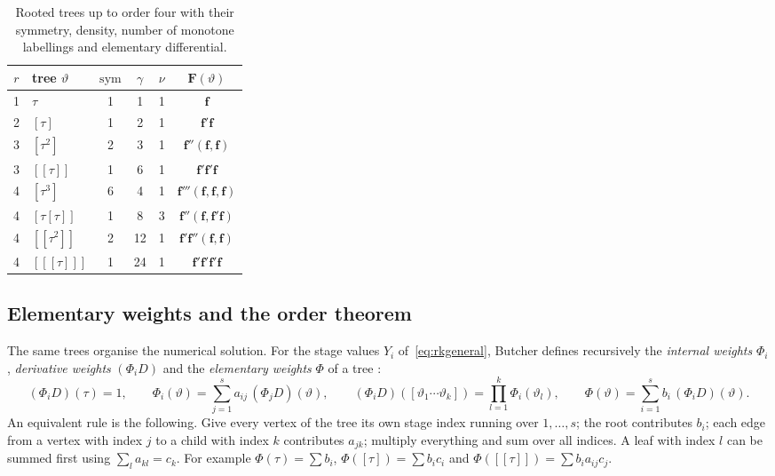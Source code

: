 \documentclass[11pt,a4paper]{article}
\newcommand{\bff}{\mathbf{f}}
\begin{document}
\begin{table}[H]
\centering
\begin{tabular}{@{}clcccc@{}}
\toprule
$r$ & tree $\vartheta$ & $\mathrm{sym}$ & $\gamma$ & $\nu$ & $\mathbf F(\vartheta)$\\
\midrule
1 & $\tau$ & 1 & 1 & 1 & $\bff$\\
2 & $[\tau]$ & 1 & 2 & 1 & $\bff'\bff$\\
3 & $[\tau^2]$ & 2 & 3 & 1 & $\bff''(\bff,\bff)$\\
3 & $[[\tau]]$ & 1 & 6 & 1 & $\bff'\bff'\bff$\\
4 & $[\tau^3]$ & 6 & 4 & 1 & $\bff'''(\bff,\bff,\bff)$\\
4 & $[\tau[\tau]]$ & 1 & 8 & 3 & $\bff''(\bff,\bff'\bff)$\\
4 & $[[\tau^2]]$ & 2 & 12 & 1 & $\bff'\bff''(\bff,\bff)$\\
4 & $[[[\tau]]]$ & 1 & 24 & 1 & $\bff'\bff'\bff'\bff$\\
\bottomrule
\end{tabular}
\caption{Rooted trees up to order four with their symmetry, density, number of monotone labellings and
elementary differential.}
\label{tab:trees}
\end{table}

\subsection{Elementary weights and the order theorem}\label{sec:orderthm}

The same trees organise the numerical solution. For the stage values $Y_i$ of~\eqref{eq:rkgeneral}, Butcher
defines recursively the \emph{internal weights} $\Phi_i$, \emph{derivative weights} $(\Phi_iD)$ and the
\emph{elementary weights} $\Phi$ of a tree \cite[Def.~312A]{butcher2008}:
\begin{equation}
(\Phi_iD)(\tau)=1,\qquad
\Phi_i(\vartheta)=\sum_{j=1}^{s}a_{ij}\,(\Phi_jD)(\vartheta),\qquad
(\Phi_iD)([\vartheta_1\cdots\vartheta_k])=\prod_{l=1}^{k}\Phi_i(\vartheta_l),\qquad
\Phi(\vartheta)=\sum_{i=1}^{s}b_i\,(\Phi_iD)(\vartheta).
\end{equation}
An equivalent rule \cite[Lemma~312B]{butcher2008} is the following. Give every vertex of the tree its own
stage index running over $1,\dots,s$; the root contributes $b_i$; each edge from a vertex with index $j$ to
a child with index $k$ contributes $a_{jk}$; multiply everything and sum over all indices. A leaf with index
$l$ can be summed first using $\sum_la_{kl}=c_k$. For example $\Phi(\tau)=\sum b_i$, $\Phi([\tau])=\sum b_ic_i$ and
$\Phi([[\tau]])=\sum b_ia_{ij}c_j$.
\end{document}
